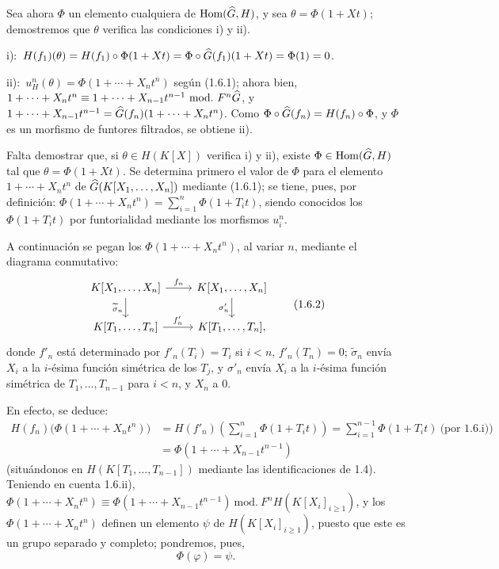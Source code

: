 Sea ahora \(\Phi\) un elemento cualquiera de \(\operatorname{Hom}(\widehat G,H)\), y sea \(\theta=\Phi(1+Xt)\); demostremos que \(\theta\) verifica las condiciones i) y ii).

i):~\(H(f_1)(\theta)=H(f_1)\circ\Phi(1+Xt)=\Phi\circ\widehat G(f_1)(1+Xt)=\Phi(1)=0\).

ii):~\(u_H^n(\theta)=\Phi(1+\cdots+X_nt^n)\) según (1.6.1); ahora bien, \(1+\cdots+X_nt^n\equiv 1+\cdots+X_{n-1}t^{n-1}\ \mathrm{mod.}\ F^n\Ghat\), y \(1+\cdots+X_{n-1}t^{n-1}=\widehat G(f_n)(1+\cdots+X_nt^n)\). Como \(\Phi\circ\widehat G(f_n)=H(f_n)\circ\Phi\), y \(\Phi\) es un morfismo de funtores filtrados, se obtiene ii).

Falta demostrar que, si \(\theta\in H(K[X])\) verifica i) y ii), existe \(\Phi\in\operatorname{Hom}(\widehat G,H)\) tal que \(\theta=\Phi(1+Xt)\).
Se determina primero el valor de \(\Phi\) para el elemento \(1+\cdots+X_nt^n\) de \(\widehat G(K[X_1,\ldots,X_n])\) mediante (1.6.1); se tiene, pues, por definición: \(\Phi(1+\cdots+X_nt^n)=\sum\limits_{i=1}^n \Phi(1+T_it)\), siendo conocidos los \(\Phi(1+T_it)\) por funtorialidad mediante los morfismos \(u_i^n\).

A continuación se pegan los \(\Phi(1+\cdots+X_nt^n)\), al variar \(n\), mediante el diagrama conmutativo:
\[
\begin{tikzcd}
K[X_1,\ldots,X_n] \arrow[r,"f_n"] \arrow[d,"\widetilde{\sigma}_n"'] &
K[X_1,\ldots,X_n] \arrow[d,"\sigma'_n"']\\
K[T_1,\ldots,T_n] \arrow[r,"f'_n"] &
K[T_1,\ldots,T_n],
\end{tikzcd}
\tag{1.6.2}
\]
donde \(f'_n\) está determinado por \(f'_n(T_i)=T_i\) si \(i<n\), \(f'_n(T_n)=0\); \(\widetilde{\sigma}_n\) envía \(X_i\) a la \(i\)-ésima función simétrica de los \(T_j\), y \(\sigma'_n\) envía \(X_i\) a la \(i\)-ésima función simétrica de \(T_1,\ldots,T_{n-1}\) para \(i<n\), y \(X_n\) a \(0\).

En efecto, se deduce:
\[
\begin{aligned}
H(f_n)\bigl(\Phi(1+\cdots+X_nt^n)\bigr)
&=H(f'_n)\left(\sum_{i=1}^n \Phi(1+T_it)\right)
=\sum_{i=1}^{n-1}\Phi(1+T_it)\ \text{(por 1.6.i))}\\
&=\Phi(1+\cdots+X_{n-1}t^{n-1})
\end{aligned}
\]
(situándonos en \(H(K[T_1,\ldots,T_{n-1}])\) mediante las identificaciones de 1.4). Teniendo en cuenta 1.6.ii), \(\Phi(1+\cdots+X_nt^n)\equiv\Phi(1+\cdots+X_{n-1}t^{n-1})\ \mathrm{mod.}\ F^nH(K[X_i]_{i\geq1})\), y los \(\Phi(1+\cdots+X_nt^n)\) definen un elemento \(\psi\) de \(H(K[X_i]_{i\geq1})\), puesto que este es un grupo separado y completo; pondremos, pues,
\[
  \Phi(\varphi)=\psi .
\]

